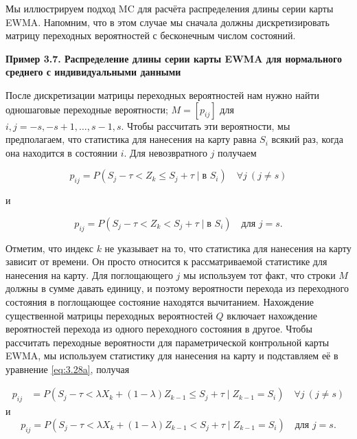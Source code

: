 Мы иллюстрируем подход MC для расчёта распределения длины серии карты EWMA. Напомним, что в этом случае мы сначала должны дискретизировать матрицу переходных вероятностей с бесконечным числом состояний.

\noindent\textbf{Пример 3.7. Распределение длины серии карты EWMA для нормального среднего с индивидуальными данными}

После дискретизации матрицы переходных вероятностей нам нужно найти одношаговые переходные вероятности; \(M = [p_{ij}]\) для \(i, j = -s, -s+1, \ldots, s-1, s\). Чтобы рассчитать эти вероятности, мы предполагаем, что статистика для нанесения на карту равна \(S_{i}\) всякий раз, когда она находится в состоянии \(i\). Для невозвратного \(j\) получаем

\begin{equation}
p_{ij} = P(S_j - \tau < Z_k \leq S_j + \tau \mid \text{в } S_i) \quad \forall j \ (j \neq s)
\label{eq:3.28a}
\end{equation}

и

\begin{equation}
p_{ij} = P(S_j - \tau < Z_k < S_j + \tau \mid \text{в } S_i) \quad \text{для } j = s.
\label{eq:3.28b}
\end{equation}

Отметим, что индекс \(k\) не указывает на то, что статистика для нанесения на карту зависит от времени. Он просто относится к рассматриваемой статистике для нанесения на карту. Для поглощающего \(j\) мы используем тот факт, что строки \(M\) должны в сумме давать единицу, и поэтому вероятности перехода из переходного состояния в поглощающее состояние находятся вычитанием. Нахождение существенной матрицы переходных вероятностей \(Q\) включает нахождение вероятностей перехода из одного переходного состояния в другое. Чтобы рассчитать переходные вероятности для параметрической контрольной карты EWMA, мы используем статистику для нанесения на карту и подставляем её в уравнение \eqref{eq:3.28a}, получая

\[
\begin{aligned}
p_{ij} &= P(S_j - \tau < \lambda X_k + (1 - \lambda)Z_{k-1} \leq S_j + \tau \mid Z_{k-1} = S_i) \quad \forall j \ (j \neq s)
\end{aligned}
\]
и
\begin{equation}
p_{ij} = P(S_j - \tau < \lambda X_k + (1 - \lambda)Z_{k-1} < S_j + \tau \mid Z_{k-1} = S_i) \quad \text{для } j = s.
\label{eq:3.29}
\end{equation}

